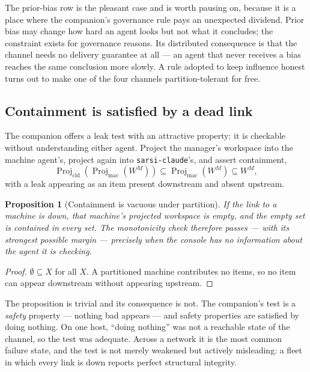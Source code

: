 \documentclass[11pt]{article}
\newtheorem{proposition}{Proposition}
\newcommand{\code}[1]{\texttt{\small #1}}
\newcommand{\Proj}{\operatorname{Proj}}
\begin{document}
The prior-bias row is the pleasant case and is worth pausing on, because it is a place where the companion's governance rule pays an unexpected dividend. Prior bias may change how hard an agent looks but not what it concludes; the constraint exists for governance reasons. Its distributed consequence is that the channel needs no delivery guarantee at all --- an agent that never receives a bias reaches the same conclusion more slowly. A rule adopted to keep influence honest turns out to make one of the four channels partition-tolerant for free.

\subsection{Containment is satisfied by a dead link}

The companion offers a leak test with an attractive property: it is checkable without understanding either agent. Project the manager's workspace into the machine agent's, project again into \code{sarsi-claude}'s, and assert containment,
\[
\Proj_{\mathrm{cld}}\!\left(\Proj_{\mathrm{mac}}(W^{M})\right) \subseteq \Proj_{\mathrm{mac}}(W^{M}) \subseteq W^{M},
\]
with a leak appearing as an item present downstream and absent upstream.

\begin{proposition}[Containment is vacuous under partition]
\label{prop:vacuous}
If the link to a machine is down, that machine's projected workspace is empty, and the empty set is contained in every set. The monotonicity check therefore passes --- with its strongest possible margin --- precisely when the console has no information about the agent it is checking.
\end{proposition}

\begin{proof}
$\emptyset \subseteq X$ for all $X$. A partitioned machine contributes no items, so no item can appear downstream without appearing upstream.
\end{proof}

The proposition is trivial and its consequence is not. The companion's test is a \emph{safety} property --- nothing bad appears --- and safety properties are satisfied by doing nothing. On one host, ``doing nothing'' was not a reachable state of the channel, so the test was adequate. Across a network it is the most common failure state, and the test is not merely weakened but actively misleading: a fleet in which every link is down reports perfect structural integrity.
\end{document}
